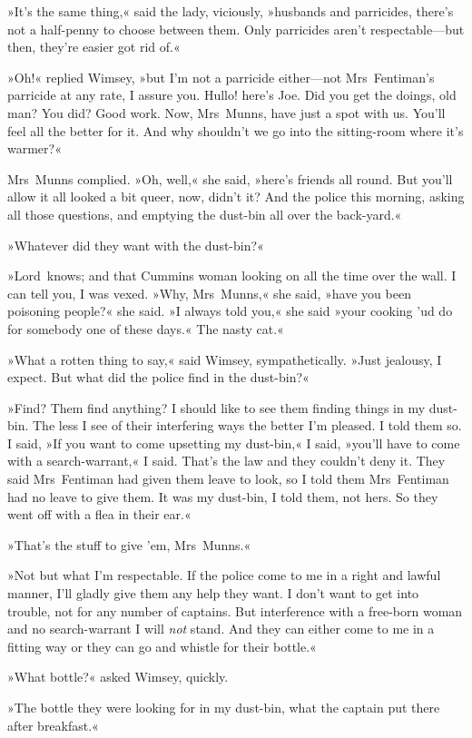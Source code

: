 »It's the same thing,« said the lady, viciously, »husbands and parricides, there's not a half-penny to choose between them. Only parricides aren't respectable—but then, they're easier got rid of.«

»Oh!« replied Wimsey, »but I'm not a parricide either—not Mrs~Fentiman's parricide at any rate, I assure you. Hullo! here's Joe. Did you get the doings, old man? You did? Good work. Now, Mrs~Munns, have just a spot with us. You'll feel all the better for it. And why shouldn't we go into the sitting-room where it's warmer?«

Mrs~Munns complied. »Oh, well,« she said, »here's friends all round. But you'll allow it all looked a bit queer, now, didn't it? And the police this morning, asking all those questions, and emptying the dust-bin all over the back-yard.«

»Whatever did they want with the dust-bin?«

»Lord~knows; and that Cummins woman looking on all the time over the wall. I can tell you, I was vexed. »Why, Mrs~Munns,« she said, »have you been poisoning people?« she said. »I always told you,« she said »your cooking 'ud do for somebody one of these days.« The nasty cat.«

»What a rotten thing to say,« said Wimsey, sympathetically. »Just jealousy, I expect. But what did the police find in the dust-bin?«

»Find? Them find anything? I should like to see them finding things in my dust-bin. The less I see of their interfering ways the better I'm pleased. I told them so. I said, »If you want to come upsetting my dust-bin,« I said, »you'll have to come with a search-warrant,« I said. That's the law and they couldn't deny it. They said Mrs~Fentiman had given them leave to look, so I told them Mrs~Fentiman had no leave to give them. It was my dust-bin, I told them, not hers. So they went off with a flea in their ear.«

»That's the stuff to give 'em, Mrs~Munns.«

»Not but what I'm respectable. If the police come to me in a right and lawful manner, I'll gladly give them any help they want. I don't want to get into trouble, not for any number of captains. But interference with a free-born woman and no search-warrant I will \textit{not} stand. And they can either come to me in a fitting way or they can go and whistle for their bottle.«

»What bottle?« asked Wimsey, quickly.

»The bottle they were looking for in my dust-bin, what the captain put there after breakfast.«

